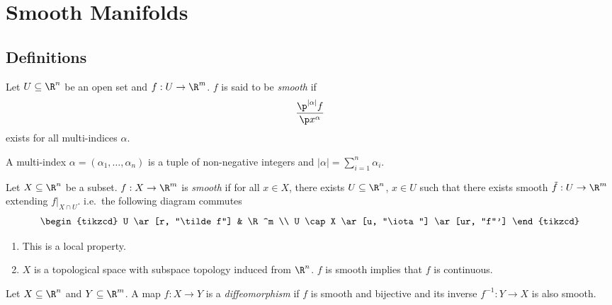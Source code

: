 \documentclass[a4paper]{article}
\begin{document}


\tableofcontents

\section{Smooth Manifolds}

\subsection{Definitions}

\begin{definition}[Smooth]
  Let \(U \subseteq \R^n\) be an open set and \(f: U \to \R^m\). \(f\) is said to be \emph{smooth} if
  \[
    \frac{\p^{|\alpha|} f}{\p x^\alpha}
  \]
  exists for all multi-indices \(\alpha\).
\end{definition}

\begin{notation}
  A multi-index \(\alpha = (\alpha_1, \dots, \alpha_n)\) is a tuple of non-negative integers and \(|\alpha| = \sum_{i = 1}^n \alpha_i\).
\end{notation}

\begin{definition}[Smooth]
  Let \(X \subseteq \R^n\) be a subset. \(f: X \to \R^m\) is \emph{smooth} if for all \(x \in X\), there exists \(U \subseteq \R^n\), \(x \in U\) such that there exists smooth \(\tilde f: U \to \R^m\) extending \(f|_{X \cap U}\). i.e.\ the following diagram commutes
  \[
    \begin{tikzcd}
      U \ar[r, "\tilde f"] & \R^m \\
      U \cap X \ar[u, "\iota"] \ar[ur, "f"']
    \end{tikzcd}
  \]
\end{definition}

\begin{remark}\leavevmode
  \begin{enumerate}
    \item This is a local property.
    \item \(X\) is a topological space with subspace topology induced from \(\R^n\). \(f\) is smooth implies that \(f\) is continuous.
    \end{enumerate}
\end{remark}

\begin{definition}[Diffeomorphism]
  Let \(X \subseteq \R^n\) and \(Y \subseteq \R^m\). A map \(f: X \to Y\) is a \emph{diffeomorphism} if \(f\) is smooth and bijective and its inverse \(f^{-1}: Y \to X\) is also smooth.
\end{definition}
\end{document}
